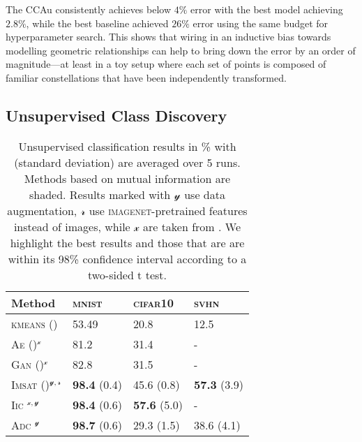 The \gls{CCAu} consistently achieves below $4\%$ error with the best model achieving $2.8\%$, while the best baseline achieved $26\%$ error using the same budget for hyperparameter search.
This shows that wiring in an inductive bias towards modelling geometric relationships can help to bring down the error by an order of magnitude—at least in a toy setup where each set of points is composed of familiar constellations that have been independently transformed.

\subsection{Unsupervised Class Discovery}
\label{sec:cls_experiments}

\begin{table}
\centering
\begin{minipage}[c]{.28\linewidth}
    \centering
    \caption{
        Unsupervised classification results in \% with (standard deviation) are averaged over 5 runs. Methods based on mutual information are shaded. Results marked with $\mathcal{y}$ use data augmentation, ${\mathcal{r}}$ use \textsc{imagenet}-pretrained features instead of images, while ${\mathcal{x}}$ are taken from \cite{Iic}. We highlight the best results and those that are are within its 98\% confidence interval according to a two-sided t test.
    }
    \label{tab:results}
\end{minipage}
\hfill
\begin{minipage}[c]{.7\linewidth}
    \centering
    \small
    \begin{tabular}{@{}llll@{}}
        Method & \textsc{mnist} & \textsc{cifar10} & \textsc{svhn} \\
        \midrule
        \textsc{kmeans} (\cite{Adc}) & 53.49 & 20.8 & 12.5 \\
        \textsc{Ae} (\cite{Ae})$^{\mathcal{x}}$ & 81.2 & 31.4 & - \\
        \textsc{Gan} (\cite{Gan})$^{\mathcal{x}}$ & 82.8 & 31.5 & - \\
        \rowcolor[HTML]{EFEFEF} 
        \textsc{Imsat} (\cite{Imsat})$^{\mathcal{y}, \mathcal{r}}$ & \textbf{98.4} (0.4) & 45.6 (0.8) & \textbf{57.3} (3.9) \\ 
        \rowcolor[HTML]{EFEFEF} 
        \textsc{Iic} \citep{Iic}$^{\mathcal{x}, \mathcal{y}}$ & \textbf{98.4} (0.6) & \textbf{57.6} (5.0) & - \\
        \rowcolor[HTML]{EFEFEF} 
        \textsc{Adc} \citep{Adc}$^\mathcal{y}$ & \textbf{98.7} (0.6) & 29.3 (1.5) & 38.6 (4.1) \\

\end{tabular}
\end{minipage}
\end{table}
